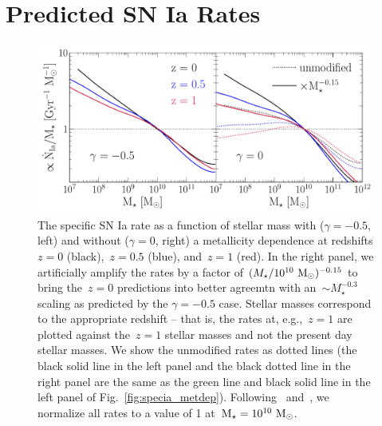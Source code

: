 \documentclass[ms.tex]{subfiles}
\begin{document}
\section{Predicted SN Ia Rates}
\label{sec:predictions}

\begin{figure}
\centering
\includegraphics[scale = 0.56]{umachine_iarate_redshiftevol.pdf}
\caption{
The specific SN Ia rate as a function of stellar mass with ($\gamma = -0.5$,
left) and without ($\gamma = 0$, right) a metallicity dependence at redshifts
$z = 0$ (black),~$z = 0.5$ (blue), and~$z = 1$ (red).
In the right panel, we artificially amplify the rates by a factor of
$(M_\star / 10^{10}~\text{M}_\odot)^{-0.15}$ to bring the~$z = 0$ predictions into
better agreemtn with an~$\sim M_\star^{-0.3}$ scaling as predicted by the
$\gamma = -0.5$ case.
Stellar masses correspond to the appropriate redshift -- that is, the rates at,
e.g.,~$z = 1$ are plotted against the~$z = 1$ stellar masses and not the
present day stellar masses.
We show the unmodified rates as dotted lines (the black solid line in the left
panel and the black dotted line in the right panel are the same as the green
line and black solid line in the left panel of Fig.~\ref{fig:specia_metdep}).
Following~\citet{Brown2019} and~\citet{Gandhi2022}, we normalize all rates to
a value of 1 at~$\text{M}_\star = 10^{10}~\text{M}_\odot$.
}
\label{fig:specia_zdep}
\end{figure}
\end{document}
